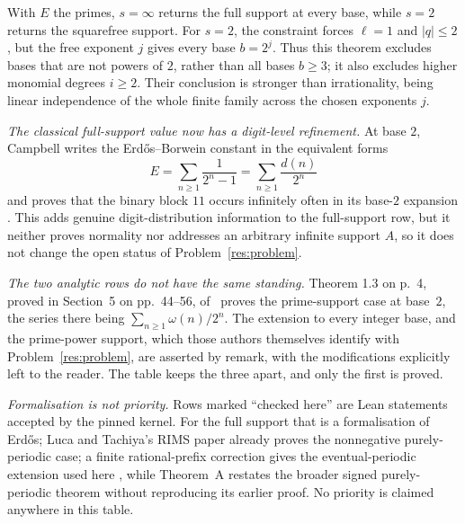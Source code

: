 \documentclass[11pt]{article}
\begin{document}
With $E$ the primes,
$s=\infty$ returns the full support at every base, while $s=2$ returns the
squarefree support.  For \(s=2\), the constraint forces \(\ell=1\) and
\(|q|\le2\), but the free exponent \(j\) gives every base \(b=2^j\).
Thus this theorem excludes bases that are not powers of \(2\), rather than all
bases \(b\ge3\); it also excludes higher monomial degrees \(i\ge2\).
Their conclusion is stronger than irrationality, being linear independence of
the whole finite family across the chosen exponents \(j\).

\emph{The classical full-support value now has a digit-level refinement.}
At base \(2\), Campbell writes the Erd\H{o}s--Borwein constant in the
equivalent forms
\[
  E=\sum_{n\ge1}\frac1{2^n-1}
   =\sum_{n\ge1}\frac{d(n)}{2^n}
\]
and proves that the binary block \(11\) occurs infinitely often in its
base-\(2\) expansion
\cite[Theorem~1, p.~12; proof pp.~12--24]{campbell2026}.
This adds genuine digit-distribution information to the full-support row, but
it neither proves normality nor addresses an arbitrary infinite support
\(A\), so it does not change the open status of Problem~\ref{res:problem}.

\emph{The two analytic rows do not have the same standing.}  Theorem 1.3
on p.~4, proved in Section~5 on pp.~44--56,
of~\cite{taoteravainen2025} proves the prime-support case at base~$2$, the
series there being $\sum_{n\ge1}\omega(n)/2^n$.  The extension to every
integer base, and the prime-power support, which those authors themselves
identify with Problem~\ref{res:problem}, are asserted by remark, with the
modifications explicitly left to the reader.  The table keeps the three apart,
and only the first is proved.

\emph{Formalisation is not priority.}  Rows marked ``checked here'' are Lean
statements accepted by the pinned kernel.  For the full support that is a
formalisation of Erd\H{o}s; Luca and Tachiya's RIMS paper already proves the
nonnegative purely-periodic case; a finite rational-prefix correction gives
the eventual-periodic extension used here
\cite[Theorem~1, p.~139; proof pp.~149--150]{lucatachiya2017}, while
Theorem~A restates the broader signed purely-periodic theorem without
reproducing its earlier proof.  No priority is claimed anywhere in this table.
\end{document}
